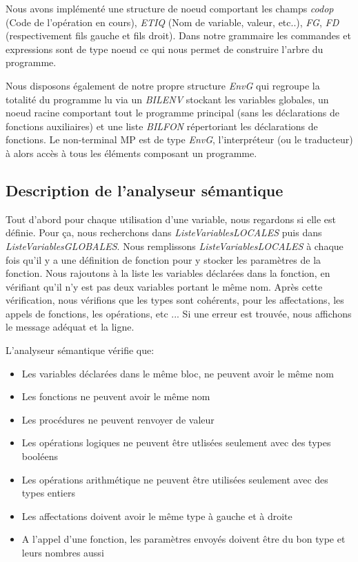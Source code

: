 \documentclass[10pt,a4paper]{article}
\begin{document}
Nous avons implémenté une structure de noeud comportant les champs \textit{codop} (Code de l'opération en cours), \textit{ETIQ} (Nom de variable, valeur, etc..), \textit{FG}, \textit{FD} 
(respectivement fils gauche et fils droit). Dans notre grammaire les commandes et expressions sont de type noeud ce qui nous permet de construire l'arbre du programme.

Nous disposons également de notre propre structure \textit{EnvG} qui regroupe la totalité du programme lu via un \textit{BILENV} stockant les variables globales, un noeud racine comportant tout le programme principal (sans les déclarations de fonctions auxiliaires) et une liste \textit{BILFON} répertoriant les déclarations de fonctions. 
Le non-terminal MP est de type \textit{EnvG}, l'interpréteur (ou le traducteur) à alors accès à tous les éléments composant un programme.

\subsection{Description de l'analyseur sémantique}
Tout d'abord pour chaque utilisation d'une variable, nous regardons si elle est définie. Pour ça, nous recherchons dans \textit{ListeVariablesLOCALES} puis dans \textit{ListeVariablesGLOBALES}. Nous remplissons \textit{ListeVariablesLOCALES} à chaque fois qu'il y a une définition de fonction pour y stocker les paramètres de la fonction. Nous rajoutons à la liste  les variables déclarées dans la fonction, en vérifiant qu'il n'y est pas deux variables portant le même nom.
Après cette vérification, nous vérifions que les types sont cohérents, pour les affectations, les appels de fonctions, les opérations, etc ...
Si une erreur est trouvée, nous affichons le message adéquat et la ligne.


L'analyseur sémantique vérifie que:\newline
\begin{itemize}
    \item Les variables déclarées dans le même bloc, ne peuvent avoir le même nom
    \item Les fonctions ne peuvent avoir le même nom
    \item Les procédures ne peuvent renvoyer de valeur
    \item Les opérations logiques ne peuvent être utlisées seulement avec des types booléens
    \item Les opérations arithmétique ne peuvent être utilisées seulement avec des types entiers
    \item Les affectations doivent avoir le même type à gauche et à droite
    \item A l'appel d'une fonction, les paramètres envoyés doivent être du bon type et leurs nombres aussi
\end{itemize}
\end{document}
